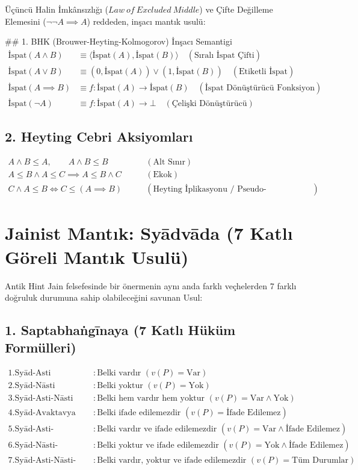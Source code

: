 \documentclass[11pt, a4paper]{article}
\begin{document}
Üçüncü Halin İmkânsızlığı ($Law\ of\ Excluded\ Middle$) ve Çifte Değilleme Elemesini ($\neg\neg A \implies A$) reddeden, inşacı mantık usulü:

\## 1. BHK (Brouwer-Heyting-Kolmogorov) İnşacı Semantigi
\begin{align}
\text{İspat}(A \land B) &\equiv \langle \text{İspat}(A), \text{İspat}(B) \rangle \quad (\text{Sıralı İspat Çifti}) \\
\text{İspat}(A \lor B) &\equiv (0, \text{İspat}(A)) \lor (1, \text{İspat}(B)) \quad (\text{Etiketli İspat}) \\
\text{İspat}(A \implies B) &\equiv f : \text{İspat}(A) \longrightarrow \text{İspat}(B) \quad (\text{İspat Dönüştürücü Fonksiyon}) \\
\text{İspat}(\neg A) &\equiv f : \text{İspat}(A) \longrightarrow \bot \quad (\text{Çelişki Dönüştürücü})
\end{align}

\subsection{2. Heyting Cebri Aksiyomları}
\begin{align}
A \land B \le A, \qquad A \land B \le B \qquad &(\text{Alt Sınır}) \\
A \le B \land A \le C \implies A \le B \land C \qquad &(\text{Ekok}) \\
C \land A \le B \iff C \le (A \implies B) \qquad &(\text{Heyting İplikasyonu / Pseudo-Complement})
\end{align}

\section{Jainist Mantık: Syādvāda (7 Katlı Göreli Mantık Usulü)}

Antik Hint Jain felsefesinde bir önermenin aynı anda farklı veçhelerden 7 farklı doğruluk durumuna sahip olabileceğini savunan Usul:

\subsection{1. Saptabhaṅgīnaya (7 Katlı Hüküm Formülleri)}
\begin{align}
1. \text{Syād-Asti} &: \text{Belki vardır } (v(P) = \text{Var}) \\
2. \text{Syād-Nāsti} &: \text{Belki yoktur } (v(P) = \text{Yok}) \\
3. \text{Syād-Asti-Nāsti} &: \text{Belki hem vardır hem yoktur } (v(P) = \text{Var} \land \text{Yok}) \\
4. \text{Syād-Avaktavya} &: \text{Belki ifade edilemezdir } (v(P) = \text{İfade Edilemez}) \\
5. \text{Syād-Asti-Avaktavya} &: \text{Belki vardır ve ifade edilemezdir } (v(P) = \text{Var} \land \text{İfade Edilemez}) \\
6. \text{Syād-Nāsti-Avaktavya} &: \text{Belki yoktur ve ifade edilemezdir } (v(P) = \text{Yok} \land \text{İfade Edilemez}) \\
7. \text{Syād-Asti-Nāsti-Avaktavya} &: \text{Belki vardır, yoktur ve ifade edilemezdir } (v(P) = \text{Tüm Durumlar})
\end{align}
\end{document}
